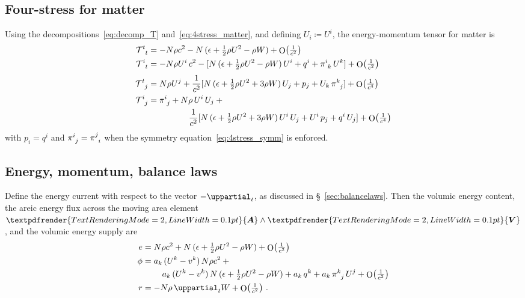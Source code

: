 \documentclass[\ifafour a4paper,12pt,\else a5paper,10pt,\fi%
onecolumn,oneside,article,%
british%
]{memoir}
\theoremstyle{remark}
\theoremstyle{innote}
\renewcommand*{\bm}[1]{\textpdfrender{TextRenderingMode=2,LineWidth=0.1pt}{\boldsymbol{#1}}}
\newcommand*{\de}{\uppartial}%
\DeclareMathOperator{\Ord}{O}%
\newcommand*{\defd}{\coloneqq}
\renewcommand*{\|}[1][]{\nonscript\:#1\vert\nonscript\:\mathopen{}}
\newcommand*{\sect}{\S}%
\newcommand*{\cf}{{cf.}}
\renewcommand*{\i}{{}\indices}
\newcommand*{\se}[1]{\de_{#1}}
\newcommand*{\yT}{\mathcal{T}}
\newcommand*{\ye}{e}
\newcommand*{\yW}{W}
\newcommand*{\Oc}[1]{\Ord\bigl(\tfrac{1}{c^{#1}}\bigr)}
\begin{document}
\subsection{Four-stress for matter}
\label{sec:GCRS_fourstress}

Using the decompositions~\eqref{eq:decomp_T} and~\eqref{eq:4stress_matter}, and defining $U_{i}\defd U^{i}$, the energy-momentum tensor for matter is \autocites[\cf][\sect\,8.1.2, where it is assumed that there's no heat flux and that the 3-stress is isotropic]{poissonetal2014}
\begin{equation}
  \label{eq:fourstress_matter_GCRS}
  \begin{aligned}
    \yT\i{^{t}_{t}} &=
    - N\rho c^{2} -N\,(\epsilon + \tfrac12 \rho U^{2} - \rho\yW) + \Oc{2}
    \\
    \yT\i{^{i}_{t}} &=
    -  N\rho U^{i}\, c^{2} -
    [N\,(\epsilon + \tfrac12\rho U^{2} -\rho\yW)\,U^{i} +
    q^{i} + \pi\i{^{i}_{k}}\,U^{k}] + \Oc{2}
    \\[\jot]
    \yT\i{^{t}_{j}} &=
    N\rho U^{j} + \frac{1}{c^{2}} [
    N\,(\epsilon + \tfrac12 \rho U^{2} + 3\rho\yW)\,U_{j} +
    p_{j} + U_{k}\,\pi\i{^{k}_{j}} ] + \Oc{4}
    \\
    \yT\i{^{i}_{j}} &=
    \!\begin{multlined}[t][0.8\linewidth]
      \pi\i{^{i}_{j}} + N\rho \,U^{i}\,U_{j} + {}\\
      \frac{1}{c^{2}} [
      N\,(\epsilon + \tfrac12 \rho U^{2} + 3\rho\yW)\,U^{i}\,U_{j} +
      U^{i}\,p_{j} + q^{i}\,U_{j}] + \Oc{4}
    \end{multlined}
  \end{aligned}
\end{equation}
with $p_{i}=q^{i}$ and $\pi\i{^{i}_{j}}=\pi\i{^{j}_{i}}$ when the symmetry equation~\eqref{eq:4stress_symm} is enforced.


\subsection{Energy, momentum, balance laws}
\label{sec:GCRS_energy_momentum}

Define the energy current with respect to the vector $-\se{t}$, as discussed in \sect~\ref{sec:balancelaws}. Then the volumic energy content, the areic energy flux across the moving area element $\bm{A}\land\bm{V}$, and the volumic energy supply are
\begin{equation}
  \label{eq:energy_matter_GCRS}
  \begin{aligned}
    \ye &=
    N\rho c^{2} + N\,(\epsilon + \tfrac12 \rho U^{2} - \rho\yW) + \Oc{2}
    \\
    \phi &=
    \!\begin{multlined}[t][0.8\linewidth]
      a_{k}\,(U^{k}-v^{k})\,N\rho c^{2} +{}\\
      a_{k}\,(U^{k}-v^{k})\,N\,(\epsilon + \tfrac12 \rho U^{2} - \rho\yW) +
      a_{k}\,q^{k} + a_{k}\,\pi\i{^{k}_{j}}\,U^{j} +
      \Oc{2}
    \end{multlined}
    \\
    r &= - N\rho\,\de_{t}\yW + \Oc{2} \ .
  \end{aligned}
\end{equation}
\end{document}
